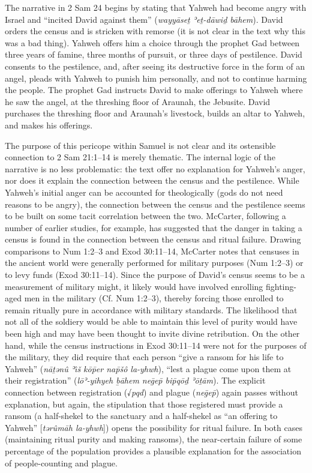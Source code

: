  The narrative in 2 Sam 24 begins by stating that Yahweh had become angry with Israel and ``incited David against them'' (\emph{wayyāseṯ ʾeṯ-dāwiḏ bāhem}). David orders the census and is stricken with remorse (it is not clear in the text why this was a bad thing). Yahweh offers him a choice through the prophet Gad between three years of famine, three months of pursuit, or three days of pestilence. David consents to the pestilence, and, after seeing its destructive force in the form of an angel, pleads with Yahweh to punish him personally, and not to continue harming the people. The prophet Gad instructs David to make offerings to Yahweh where he saw the angel, at the threshing floor of Araunah, the Jebusite. David purchases the threshing floor and Araunah's livestock, builds an altar to Yahweh, and makes his offerings. 

 The purpose of this pericope within Samuel is not clear and its ostensible connection to 2 Sam 21:1--14 is merely thematic.\autocite[509]{mccarter1984} The internal logic of the narrative is no less problematic: the text offer no explanation for Yahweh's anger, nor does it explain the connection between the census and the pestilence. While Yahweh's initial anger can be accounted for theologically (gods do not need reasons to be angry), the connection between the census and the pestilence seems to be built on some tacit correlation between the two. McCarter, following a number of earlier studies, for example, has suggested that the danger in taking a census is found in the connection between the census and ritual failure. Drawing comparisons to Num 1:2--3 and Exod 30:11--14, McCarter notes that censuses in the ancient world were generally performed for military purposes (Num 1:2--3) or to levy funds (Exod 30:11--14). Since the purpose of David's census seems to be a measurement of military might, it likely would have involved enrolling fighting-aged men in the military (Cf. Num 1:2--3), thereby forcing those enrolled to remain ritually pure in accordance with military standards. The likelihood that not all of the soldiery would be able to maintain this level of purity would have been high and may have been thought to invite divine retribution. On the other hand, while the census instructions in Exod 30:11--14 were not for the purposes of the military, they did require that each person ``give a ransom for his life to Yahweh'' (\emph{nāṯənû ʾı̂š kōp̄er nap̄šô la-yhwh}), ``lest a plague come upon them at their registration'' (\emph{lōʾ-yihyeh ḇāhem neḡep̄ bip̄qōḏ ʾōṯām}). The explicit connection between registration (√\emph{pqd}) and plague (\emph{neḡep̄}) again passes without explanation, but again, the stipulation that those registered must provide a ransom (a half-shekel to the sanctuary and a half-shekel as ``an offering to Yahweh'' {[}\emph{tərûmāh la-yhwh}{]}) opens the possibility for ritual failure. In both cases (maintaining ritual purity and making ransoms), the near-certain failure of some percentage of the population provides a plausible explanation for the association of people-counting and plague. 

